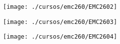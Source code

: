 \begin{figure}[!ht]
    \centering
    \texttt{[image: ./cursos/emc260/EMC2602]}
\end{figure}
\clearpage

\begin{figure}[!ht]
    \centering
    \texttt{[image: ./cursos/emc260/EMC2603]}
\end{figure}
\clearpage

\begin{figure}[!ht]
    \centering
    \texttt{[image: ./cursos/emc260/EMC2604]}
\end{figure}
\clearpage

